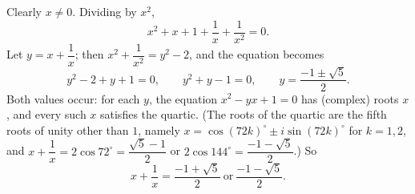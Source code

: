 Clearly $x\ne0$. Dividing by $x^2$,
\[
x^2+x+1+\dfrac{1}{x}+\dfrac{1}{x^2}=0 .
\]
Let $y=x+\dfrac{1}{x}$; then $x^2+\dfrac{1}{x^2}=y^2-2$, and the equation becomes
\[
y^2-2+y+1=0,\qquad y^2+y-1=0,\qquad y=\dfrac{-1\pm\sqrt5}{2}.
\]
Both values occur: for each $y$, the equation $x^2-yx+1=0$ has (complex) roots $x$, and every such $x$ satisfies the quartic. (The roots of the quartic are the fifth roots of unity other than $1$, namely $x=\cos\left(72k\right)^\circ\pm i\sin\left(72k\right)^\circ$ for $k=1,2$, and $x+\dfrac{1}{x}=2\cos72^\circ=\dfrac{\sqrt5-1}{2}$ or $2\cos144^\circ=\dfrac{-1-\sqrt5}{2}$.) So
\[
x+\dfrac{1}{x}=\boxed{\dfrac{-1+\sqrt5}{2}\ \text{or}\ \dfrac{-1-\sqrt5}{2}}.
\]
